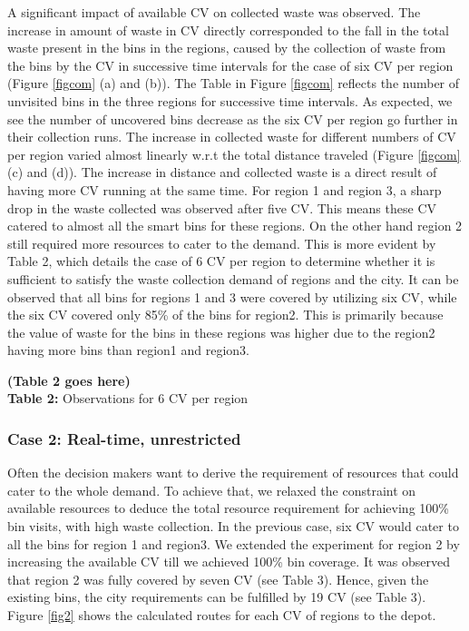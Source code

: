 \documentclass[12pt]{article}
\begin{document}
A significant impact of available CV on collected waste was observed. The increase in amount of waste in CV directly corresponded to the fall in the total waste present in the bins in the regions, caused by the collection of waste from the bins by the CV in successive time intervals for the case of six CV per region (Figure \ref{figcom} (a) and (b)). The Table in Figure \ref{figcom} reflects the number of unvisited bins in the three regions for successive time intervals. As expected, we see the number of uncovered bins decrease as the six CV per region go further in their collection runs. The increase in collected waste for different numbers of CV per region varied almost linearly w.r.t the total distance traveled (Figure \ref{figcom} (c) and (d)). The increase in distance and collected waste is a direct result of having more CV running at the same time. For region 1 and region 3, a sharp drop in the waste collected was observed after five CV. This means these CV catered to almost all the smart bins for these regions. On the other hand region 2 still required more resources to cater to the demand. This is more evident by Table 2, which details the case of 6 CV per region to determine whether it is sufficient to satisfy the waste collection demand of regions and the city. It can be observed that all bins for regions 1 and 3 were covered by utilizing six CV, while the six CV covered only 85\% of the bins for region2. This is primarily because the value of waste for the bins in these regions was higher due to the region2 having more bins than region1 and region3.

\begin{center}
    \textbf{(Table 2 goes here)}\\
    \textbf{Table 2:} Observations for 6 CV per region
\end{center}

\subsubsection*{Case 2: Real-time, unrestricted}

Often the decision makers want to derive the requirement of resources that could cater to the whole demand. To achieve that, we relaxed the constraint on available resources to deduce the total resource requirement for achieving 100\% bin visits, with high waste collection. In the previous case, six CV would cater to all the bins for region 1 and region3. We extended the experiment for region 2 by increasing the available CV till we achieved 100\% bin coverage. It was observed that region 2 was fully covered by seven CV (see Table 3). Hence, given the existing bins, the city requirements can be fulfilled by 19 CV (see Table 3). Figure \ref{fig2} shows the calculated routes for each CV of regions to the depot. 
\end{document}

